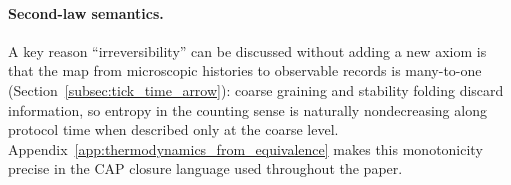 \paragraph{Second-law semantics.}
\InterfaceTag A key reason ``irreversibility'' can be discussed without adding a new axiom is that the map from microscopic histories to observable records is many-to-one (Section~\ref{subsec:tick_time_arrow}):
coarse graining and stability folding discard information, so entropy in the counting sense is naturally nondecreasing along protocol time when described only at the coarse level.
Appendix~\ref{app:thermodynamics_from_equivalence} makes this monotonicity precise in the CAP closure language used throughout the paper.


